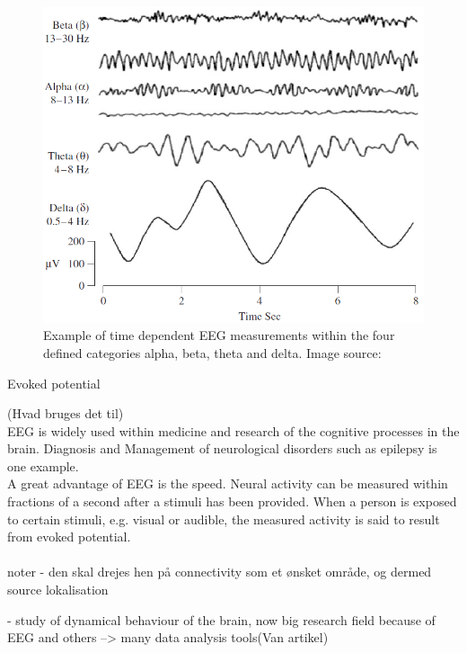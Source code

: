 \begin{figure}[h]
    \centering
    \includegraphics[scale=0.65]{figurs/EEG_example.png}
    \caption{Example of time dependent EEG measurements within the four defined categories alpha, beta, theta and delta. Image source: \cite{EEGsignalprocessing}}
    \label{fig:EEG_example}
\end{figure}
Evoked potential 


(Hvad bruges det til)\\
EEG is widely used within medicine and research of the cognitive processes in the brain. Diagnosis and Management of neurological disorders such as epilepsy is one example. \\   
A great advantage of EEG is the speed. Neural activity can be measured within fractions of a second after a stimuli has been provided\cite[p. 3]{fundamentalEEG}. When a person is exposed to certain stimuli, e.g. visual or audible, the measured activity is said to result from evoked potential.\\
\\

noter
- den skal drejes hen på connectivity som et ønsket område, og dermed source lokalisation 

- study of dynamical behaviour of the brain, now big research field because of EEG and others --> many data analysis tools(Van artikel)

